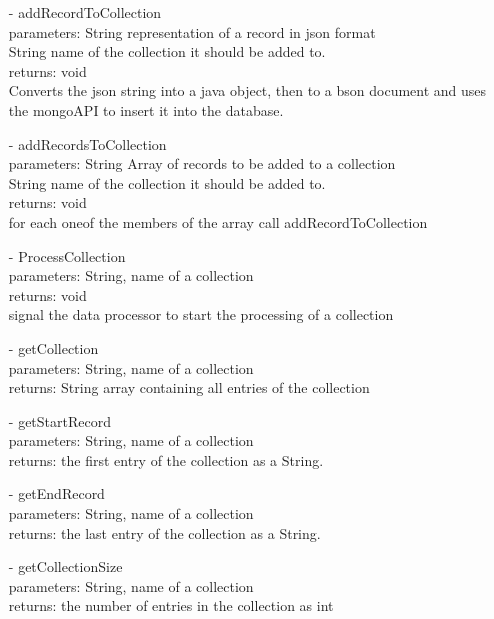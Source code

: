 \documentclass[oneside, english, final]{design}
\begin{document}
\begin{itemize}
\begin{itemize}
		      \item[-]addRecordToCollection
		            \\parameters: String representation of a record in json format
		            \\String name of the collection it should be added to.
		            \\returns: void
		            \\Converts the json string into a java object, then to a bson document and uses the mongoAPI to insert it into the database.

		      \item[-]addRecordsToCollection
		            \\parameters: String Array of records to be added to a collection
		            \\String name of the collection it should be added to.
		            \\returns: void
		            \\for each oneof the members of the array call addRecordToCollection

		      \item[-]ProcessCollection
		            \\parameters: String, name of a collection
		            \\returns: void
		            \\signal the data processor to start the processing of a collection

		      \item[-]getCollection
		            \\parameters: String, name of a collection
		            \\returns: String array containing all entries of the collection

		      \item[-]getStartRecord
		            \\parameters: String, name of a collection
		            \\returns: the first entry of the collection as a String.

		      \item[-]getEndRecord
		            \\parameters: String, name of a collection
		            \\returns: the last entry of the collection as a String.

		      \item[-]getCollectionSize
		            \\parameters: String, name of a collection
		            \\returns: the number of entries in the collection as int


\end{itemize}
\end{itemize}
\end{document}
